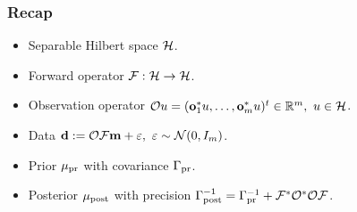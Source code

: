 \documentclass{beamer}
\begin{document}
\begin{frame}
\frametitle{Recap}

\begin{itemize}
\item Separable Hilbert space \(\mathcal{H}\).
\item Forward operator \(\mathcal{F}: \mathcal{H} \to \mathcal{H}\).
\item Observation operator \(\mathcal{O} u = (\mathbf{o}_1^*u, \dots, \mathbf{o}_m^*u )^t \in \mathbb{R}^m,\ u \in \mathcal{H}\).
\item Data \(\mathbf{d} := \mathcal{O} \mathcal{F} \mathbf{m} + \varepsilon,\ \varepsilon \sim \mathcal{N}(0,I_m)\).
\item Prior \(\mu_{\textup{pr}}\) with covariance \(\Gamma_{\textup{pr}}\).
\item Posterior \(\mu_{\textup{post}}\) with precision \(\Gamma_{\textup{post}}^{-1} = \Gamma_{\textup{pr}}^{-1} + \mathcal{F}^* \mathcal{O}^*\mathcal{O} \mathcal{F}\).
\end{itemize}
\end{frame}
\end{document}
